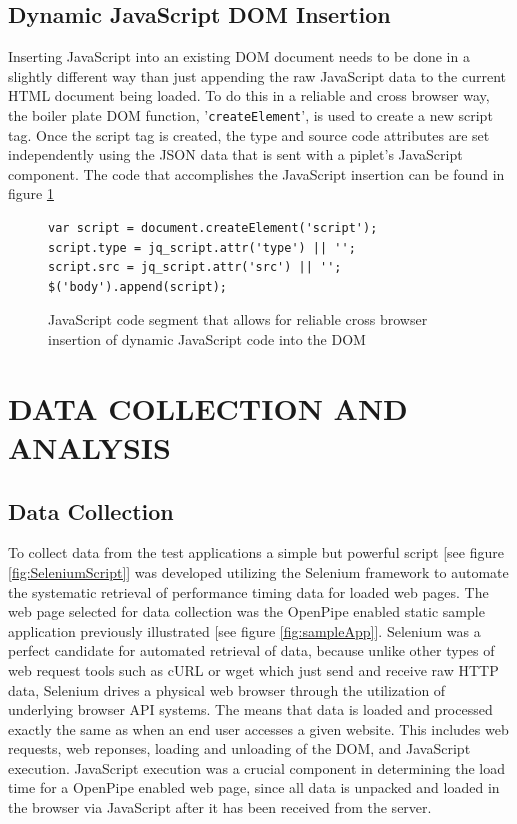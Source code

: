 \documentclass[12pt]{report}
\begin{document}
\section{Dynamic JavaScript DOM Insertion}
Inserting JavaScript into an existing DOM document needs to be done in a slightly different way than just appending the raw JavaScript data to the current HTML document being loaded. To do this in a reliable and cross browser way, the boiler plate DOM function, '\texttt{createElement}', is used to create a new script tag. Once the script tag is created, the type and source code attributes are set independently using the JSON data that is sent with a piplet's JavaScript component. The code that accomplishes the JavaScript insertion can be found in figure \ref{fig:JavaScriptInsertion}

\begin{figure}[H]
\begin{lstlisting}
var script = document.createElement('script');
script.type = jq_script.attr('type') || '';
script.src = jq_script.attr('src') || '';
$('body').append(script);
\end{lstlisting}
\caption{JavaScript code segment that allows for reliable cross browser insertion of dynamic JavaScript code into the DOM}
\label{fig:JavaScriptInsertion}
\end{figure}

\chapter{DATA COLLECTION AND ANALYSIS}

\section{Data Collection}
To collect data from the test applications a simple but powerful script [see figure \ref{fig:SeleniumScript}] was developed utilizing the Selenium framework to automate the systematic retrieval of performance timing data for loaded web pages. The web page selected for data collection was the OpenPipe enabled static sample application previously illustrated [see figure \ref{fig:sampleApp}].  Selenium was a perfect candidate for automated retrieval of data, because unlike other types of web request tools such as cURL or wget which just send and receive raw HTTP data, Selenium drives a physical web browser through the utilization of underlying browser API systems. The means that data is loaded and processed exactly the same as when an end user accesses a given website. This includes web requests, web reponses,  loading and unloading of the DOM,  and JavaScript execution. JavaScript execution was a crucial component in determining the load time for a OpenPipe enabled web page, since all data is unpacked and loaded in the browser via JavaScript after it has been received from the server.
\end{document}
